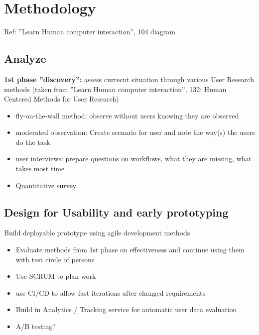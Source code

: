 \section{Methodology}
\label{subsec:methodology}


Ref: ''Learn Human computer interaction'', 104 diagram

\subsection{Analyze}
\label{subsec:analyze}

\textbf{1st phase ''discovery'':} assess currecnt situation through various User Research methods (taken from ''Learn Human computer interaction'', 132: Human Centered Methods for User Research)

\begin{itemize}
  \setlength\itemsep{-0.2em}
  \item fly-on-the-wall method: observe without users knowing they are observed
  \item moderated observation: Create scenario for user and note the way(s) the users do the task
  \item user interviews: prepare questions on workflows, what they are missing, what takes most time
  \item Quantitative survey
\end{itemize}


\subsection{Design for Usability and early prototyping}
\label{subsec:design}

Build deployable prototype using agile development methods

\begin{itemize}
  \setlength\itemsep{-0.2em}
  \item Evaluate methods from 1st phase on effectiveness and continue using them with test circle of persons
  \item Use SCRUM to plan work
  \item use CI/CD to allow fast iterations after changed requirements
  \item Build in Analytics / Tracking service for automatic user data evaluation
  \item A/B testing?
\end{itemize}


